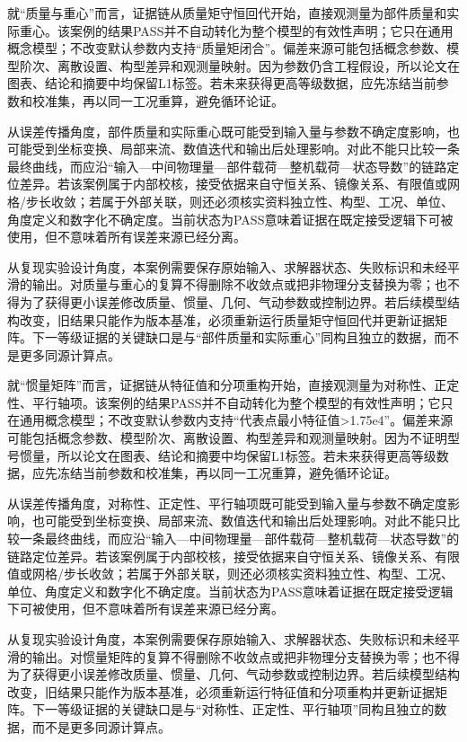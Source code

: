 \documentclass[UTF8,12pt,openany]{ctexbook}
\begin{document}
就“质量与重心”而言，证据链从质量矩守恒回代开始，直接观测量为部件质量和实际重心。该案例的结果PASS并不自动转化为整个模型的有效性声明；它只在通用概念模型；不改变默认参数内支持“质量矩闭合”。偏差来源可能包括概念参数、模型阶次、离散设置、构型差异和观测量映射。因为参数仍含工程假设，所以论文在图表、结论和摘要中均保留L1标签。若未来获得更高等级数据，应先冻结当前参数和校准集，再以同一工况重算，避免循环论证。

从误差传播角度，部件质量和实际重心既可能受到输入量与参数不确定度影响，也可能受到坐标变换、局部来流、数值迭代和输出后处理影响。对此不能只比较一条最终曲线，而应沿“输入—中间物理量—部件载荷—整机载荷—状态导数”的链路定位差异。若该案例属于内部校核，接受依据来自守恒关系、镜像关系、有限值或网格/步长收敛；若属于外部关联，则还必须核实资料独立性、构型、工况、单位、角度定义和数字化不确定度。当前状态为PASS意味着证据在既定接受逻辑下可被使用，但不意味着所有误差来源已经分离。

从复现实验设计角度，本案例需要保存原始输入、求解器状态、失败标识和未经平滑的输出。对质量与重心的复算不得删除不收敛点或把非物理分支替换为零；也不得为了获得更小误差修改质量、惯量、几何、气动参数或控制边界。若后续模型结构改变，旧结果只能作为版本基准，必须重新运行质量矩守恒回代并更新证据矩阵。下一等级证据的关键缺口是与“部件质量和实际重心”同构且独立的数据，而不是更多同源计算点。

就“惯量矩阵”而言，证据链从特征值和分项重构开始，直接观测量为对称性、正定性、平行轴项。该案例的结果PASS并不自动转化为整个模型的有效性声明；它只在通用概念模型；不改变默认参数内支持“代表点最小特征值>1.75e4”。偏差来源可能包括概念参数、模型阶次、离散设置、构型差异和观测量映射。因为不证明型号惯量，所以论文在图表、结论和摘要中均保留L1标签。若未来获得更高等级数据，应先冻结当前参数和校准集，再以同一工况重算，避免循环论证。

从误差传播角度，对称性、正定性、平行轴项既可能受到输入量与参数不确定度影响，也可能受到坐标变换、局部来流、数值迭代和输出后处理影响。对此不能只比较一条最终曲线，而应沿“输入—中间物理量—部件载荷—整机载荷—状态导数”的链路定位差异。若该案例属于内部校核，接受依据来自守恒关系、镜像关系、有限值或网格/步长收敛；若属于外部关联，则还必须核实资料独立性、构型、工况、单位、角度定义和数字化不确定度。当前状态为PASS意味着证据在既定接受逻辑下可被使用，但不意味着所有误差来源已经分离。

从复现实验设计角度，本案例需要保存原始输入、求解器状态、失败标识和未经平滑的输出。对惯量矩阵的复算不得删除不收敛点或把非物理分支替换为零；也不得为了获得更小误差修改质量、惯量、几何、气动参数或控制边界。若后续模型结构改变，旧结果只能作为版本基准，必须重新运行特征值和分项重构并更新证据矩阵。下一等级证据的关键缺口是与“对称性、正定性、平行轴项”同构且独立的数据，而不是更多同源计算点。
\end{document}
